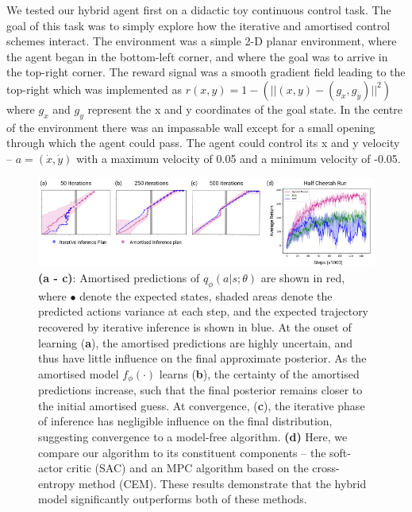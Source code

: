 We tested our hybrid agent first on a didactic toy continuous control task. The goal of this task was to simply explore how the iterative and amortised control schemes interact. The environment was a simple 2-D planar environment, where the agent began in the bottom-left corner, and where the goal was to arrive in the top-right corner. The reward signal was a smooth gradient field leading to the top-right which was implemented as $r(x,y) = 1 - (|| (x,y) - (g_x, g_y) ||^2)$ where $g_x$ and $g_y$ represent the x and y coordinates of the goal state. In the centre of the environment there was an impassable wall except for a small opening through which the agent could pass. The agent could control its x and y velocity -- $a = (\dot{x}, \dot{y})$ with a maximum velocity of 0.05 and a minimum velocity of -0.05.

\begin{figure}[t!]
  \centering
  \includegraphics[width=\textwidth]{chapter_4_figures/CHI_figure_one_edit.pdf}
  \caption{\textbf{(a - c)}: Amortised predictions of $q_{\phi}(a|s; \theta)$ are shown in red, where $\bullet$ denote the expected states, shaded areas denote the predicted actions variance at each step, and the expected trajectory recovered by iterative inference is shown in blue.
  At the onset of learning (\textbf{a}), the amortised predictions are highly uncertain, and thus have little influence on the final approximate posterior. As the amortised model $f_{\phi}(\cdot)$ learns (\textbf{b}), the certainty of the amortised predictions increase, such that the final posterior remains closer to the initial amortised guess. At convergence, (\textbf{c}), the iterative phase of inference has negligible influence on the final distribution, suggesting convergence to a model-free algorithm. \textbf{(d)} Here, we compare our algorithm to its constituent components -- the soft-actor critic (SAC) and an MPC algorithm based on the cross-entropy method (CEM). These results demonstrate that the hybrid model significantly outperforms both of these methods.}
\label{hybrid_performance_figure}
\end{figure}

